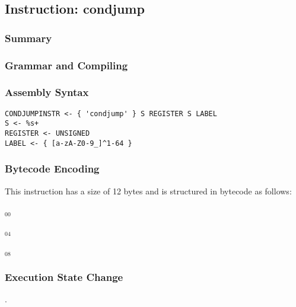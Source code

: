 \subsection{Instruction: condjump}

\subsubsection{Summary}


\subsubsection{Grammar and Compiling}


\subsubsection{Assembly Syntax}

\begin{myquote}
\begin{verbatim}
CONDJUMPINSTR <- { 'condjump' } S REGISTER S LABEL
S <- %s+
REGISTER <- UNSIGNED
LABEL <- { [a-zA-Z0-9_]^1-64 }
\end{verbatim}
\end{myquote}

\subsubsection{Bytecode Encoding}

This instruction has a size of 12 bytes and is structured in bytecode as follows:

$_{00}$\ 



$_{04}$\ 



$_{08}$\ 
\fbox{%
  \parbox{20pt}{%
00
  }%
}


\subsubsection{Execution State Change}

.


